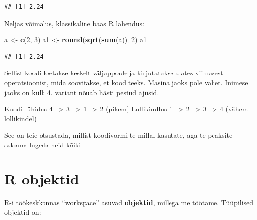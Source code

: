 \documentclass[]{book}
\newenvironment{Shaded}{\begin{snugshade}}{\end{snugshade}}
\newcommand{\KeywordTok}[1]{\textcolor[rgb]{0.13,0.29,0.53}{\textbf{#1}}}
\newcommand{\DecValTok}[1]{\textcolor[rgb]{0.00,0.00,0.81}{#1}}
\newcommand{\StringTok}[1]{\textcolor[rgb]{0.31,0.60,0.02}{#1}}
\newcommand{\OperatorTok}[1]{\textcolor[rgb]{0.81,0.36,0.00}{\textbf{#1}}}
\newcommand{\NormalTok}[1]{#1}
\begin{document}
\begin{Shaded}
\end{Shaded}

\begin{verbatim}
## [1] 2.24
\end{verbatim}

Neljas võimalus, klassikaline baas R lahendus:

\begin{Shaded}
\begin{Highlighting}[]
\NormalTok{a <-}\StringTok{ }\KeywordTok{c}\NormalTok{(}\DecValTok{2}\NormalTok{, }\DecValTok{3}\NormalTok{)}
\NormalTok{a1 <-}\StringTok{ }\KeywordTok{round}\NormalTok{(}\KeywordTok{sqrt}\NormalTok{(}\KeywordTok{sum}\NormalTok{(a)), }\DecValTok{2}\NormalTok{)}
\NormalTok{a1}
\end{Highlighting}
\end{Shaded}

\begin{verbatim}
## [1] 2.24
\end{verbatim}

Sellist koodi loetakse keskelt väljappoole ja kirjutatakse alates
viimasest operatsioonist, mida soovitakse, et kood teeks. Masina jaoks
pole vahet. Inimese jaoks on küll: 4. variant nõuab hästi pestud ajusid.

Koodi lühidus 4 --\textgreater{} 3 --\textgreater{} 1 --\textgreater{} 2
(pikem) Lollikindlus 1 --\textgreater{} 2 --\textgreater{} 3
--\textgreater{} 4 (vähem lollikindel)

See on teie otsustada, millist koodivormi te millal kasutate, aga te
peaksite oskama lugeda neid kõiki.

\chapter{R objektid}\label{obj}

R-i töökeskkonnas ``workspace'' asuvad \textbf{objektid}, millega me
töötame. Tüüpilised objektid on:
\end{document}
